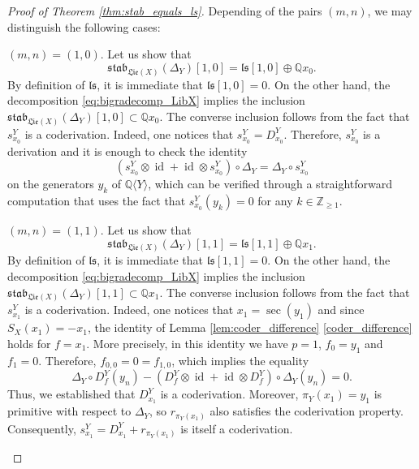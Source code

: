 \documentclass[11pt, a4paper]{amsart}
\numberwithin{equation}{section}
\theoremstyle{definition}
\newcommand{\Q}{\mathbb{Q}}
\newcommand{\QY}{\Q\langle Y\rangle}
\newcommand{\ls}{\mathfrak{ls}}
\newcommand{\id}{\operatorname{id}}
\newcommand{\Lie}{\mathfrak{Lie}}
\newcommand{\stab}{\mathfrak{stab}}
\begin{document}
\begin{proof}[Proof of Theorem \ref{thm:stab_equals_ls}]
    Depending of the pairs $(m,n)$, we may distinguish the following cases:
    \begin{caselist}
        \item $(m,n)=(1,0)$. Let us show that
        \[
            \stab_{\Lie(X)}(\Delta_Y)[1,0] = \mathfrak{ls}[1,0] \oplus \Q x_0.
        \]
        By definition of $\mathfrak{ls}$, it is immediate that $\mathfrak{ls}[1,0] = 0$. On the other hand, the decomposition \eqref{eq:bigradecomp_LibX} %
        implies the inclusion $\stab_{\Lie(X)}(\Delta_Y)[1,0] \subset \Q x_0$. The converse inclusion follows from the fact that $s_{x_0}^Y$ is a coderivation. Indeed, one notices that $s_{x_0}^Y = D_{x_0}^Y$. Therefore, $s_{x_0}^Y$ is a derivation and it is enough to check the identity
        \[
            (s^Y_{x_0} \otimes \id + \id \otimes s^Y_{x_0}) \circ \Delta_Y = \Delta_Y \circ s^Y_{x_0}
        \]
        on the generators $y_k$ of $\QY$, which can be verified through a straightforward computation that uses the fact that $s_{x_0}^Y(y_k)=0$ for any $k \in \mathbb{Z}_{\geq 1}$.
        \item $(m,n)=(1,1)$. Let us show that
        \[
            \stab_{\Lie(X)}(\Delta_Y)[1,1] = \mathfrak{ls}[1,1] \oplus \Q x_1.
        \]
        By definition of $\mathfrak{ls}$, it is immediate that $\mathfrak{ls}[1,1] = 0$. On the other hand, the decomposition \eqref{eq:bigradecomp_LibX} implies the inclusion $\stab_{\Lie(X)}(\Delta_Y)[1,1] \subset \Q x_1$. The converse inclusion follows from the fact that $s_{x_1}^Y$ is a coderivation. Indeed, one notices that $x_1=\sec(y_1)$ and since $S_X(x_1)=-x_1$,
        the identity of Lemma \ref{lem:coder_difference} \ref{coder_difference} holds for $f=x_1$. More precisely, in this identity we have $p=1$, $f_0=y_1$ and $f_1=0$. Therefore, $f_{0,0} = 0 = f_{1,0}$, which implies the equality
        \[
            \Delta_Y \circ D^Y_f(y_n) - (D_f^Y \otimes \id + \id \otimes D_f^Y) \circ \Delta_Y (y_n) = 0. 
        \]
        Thus, we established that $D_{x_1}^Y$ is a coderivation. Moreover, $\pi_Y(x_1) = y_1$ is primitive with respect to $\Delta_Y$, so $r_{\pi_Y(x_1)}$ also satisfies the coderivation property. Consequently, $s_{x_1}^Y = D_{x_1}^Y + r_{\pi_Y(x_1)}$ is itself a coderivation.

\end{caselist}
\end{proof}
\end{document}
